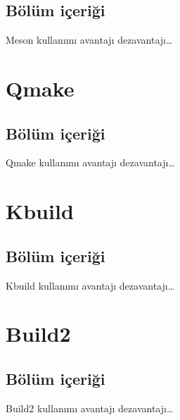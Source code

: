 \documentclass[
]{book}
\begin{document}
\hypertarget{buxf6luxfcm-iuxe7eriux11fi-5}{%
\section*{Bölüm içeriği}\label{buxf6luxfcm-iuxe7eriux11fi-5}}

Meson kullanımı avantajı dezavantajı\ldots{}

\hypertarget{qmake}{%
\chapter*{Qmake}\label{qmake}}

\hypertarget{buxf6luxfcm-iuxe7eriux11fi-6}{%
\section*{Bölüm içeriği}\label{buxf6luxfcm-iuxe7eriux11fi-6}}

Qmake kullanımı avantajı dezavantajı\ldots{}

\hypertarget{kbuild}{%
\chapter*{Kbuild}\label{kbuild}}

\hypertarget{buxf6luxfcm-iuxe7eriux11fi-7}{%
\section*{Bölüm içeriği}\label{buxf6luxfcm-iuxe7eriux11fi-7}}

Kbuild kullanımı avantajı dezavantajı\ldots{}

\hypertarget{build2}{%
\chapter*{Build2}\label{build2}}

\hypertarget{buxf6luxfcm-iuxe7eriux11fi-8}{%
\section*{Bölüm içeriği}\label{buxf6luxfcm-iuxe7eriux11fi-8}}

Build2 kullanımı avantajı dezavantajı\ldots{}
\end{document}
